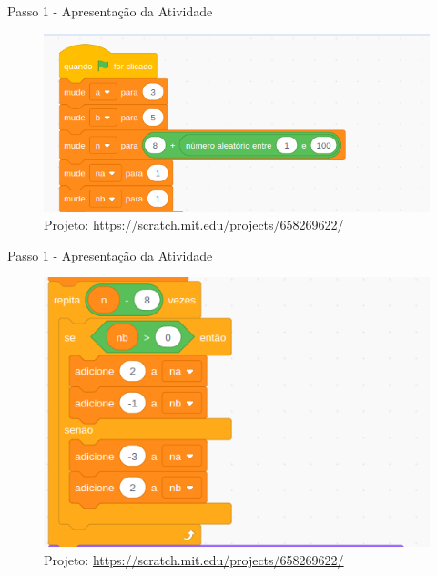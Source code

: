 \documentclass{beamer}
\begin{document}
\begin{frame}{Passo 1 - Apresentação da Atividade}


\begin{figure}
\begin{center}
	\includegraphics[scale=0.5]{images/init.png} 
\end{center}
\caption{Projeto: \url{https://scratch.mit.edu/projects/658269622/}}
\end{figure}



\end{frame}


\begin{frame}{Passo 1 - Apresentação da Atividade}


\begin{figure}
\begin{center}
	\includegraphics[scale=0.5]{images/loop.png} 
\end{center}
\caption{Projeto: \url{https://scratch.mit.edu/projects/658269622/}}
\end{figure}



\end{frame}
\end{document}
